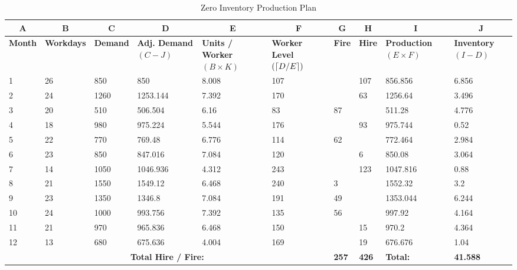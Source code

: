 \documentclass[12pt]{article}
\begin{document}
\begin{table}[H]
    \centering
    \begin{adjustbox}{width=\textwidth}
    \begin{tabular}{|l||l|l|p{1.8cm}|p{1.8cm}|p{1.8cm}|p{1.8cm}|p{1.8cm}|p{1.8cm}|p{2cm}|}
    \hline
    \multicolumn{1}{|c||}{\textbf{A}} & \multicolumn{1}{c}{\textbf{B}}& \multicolumn{1}{|c}{\textbf{C}}& \multicolumn{1}{|c}{\textbf{D}}& \multicolumn{1}{|c}{\textbf{E}}& \multicolumn{1}{|c}{\textbf{F}}& \multicolumn{1}{|c}{\textbf{G}}& \multicolumn{1}{|c}{\textbf{H}}& \multicolumn{1}{|c}{\textbf{I}}&\multicolumn{1}{|c|}{\textbf{J}} \\ \hline \hline 
        \textbf{Month} & \textbf{Workdays} & \textbf{Demand} & \textbf{Adj. Demand $(C - J)$} & \textbf{Units / Worker $(B \times K)$} & \textbf{Worker Level $(\lceil D / E\rceil)$} & \textbf{Fire} & \textbf{Hire} & \textbf{Production} $(E\times F)$ & \textbf{Inventory $(I - D)$} \\ \hline
        1 & 26 & 850 & 850 & 8.008 & 107 & ~ & 107 & 856.856 & 6.856 \\ \hline
        2 & 24 & 1260 & 1253.144 & 7.392 & 170 & ~ & 63 & 1256.64 & 3.496 \\ \hline
        3 & 20 & 510 & 506.504 & 6.16 & 83 & 87 & ~ & 511.28 & 4.776 \\ \hline
        4 & 18 & 980 & 975.224 & 5.544 & 176 & ~ & 93 & 975.744 & 0.52 \\ \hline
        5 & 22 & 770 & 769.48 & 6.776 & 114 & 62 & ~ & 772.464 & 2.984 \\ \hline
        6 & 23 & 850 & 847.016 & 7.084 & 120 & ~ & 6 & 850.08 & 3.064 \\ \hline
        7 & 14 & 1050 & 1046.936 & 4.312 & 243 & ~ & 123 & 1047.816 & 0.88 \\ \hline
        8 & 21 & 1550 & 1549.12 & 6.468 & 240 & 3 & ~ & 1552.32 & 3.2 \\ \hline
        9 & 23 & 1350 & 1346.8 & 7.084 & 191 & 49 & ~ & 1353.044 & 6.244 \\ \hline
        10 & 24 & 1000 & 993.756 & 7.392 & 135 & 56 & ~ & 997.92 & 4.164 \\ \hline
        11 & 21 & 970 & 965.836 & 6.468 & 150 & ~ & 15 & 970.2 & 4.364 \\ \hline
        12 & 13 & 680 & 675.636 & 4.004 & 169 & ~ & 19 & 676.676 & 1.04 \\ \hline \hline 
        \multicolumn{6}{|c|}{\textbf{Total Hire / Fire:}} & \textbf{257} & \textbf{426} & \multicolumn{1}{||p{2.3cm}|}{\textbf{Total:}} & \textbf{41.588} \\ \hline
    \end{tabular}
    \end{adjustbox}
    \caption{Zero Inventory Production Plan}
    \label{tab1:zeroinventory}
\end{table}
\end{document}
